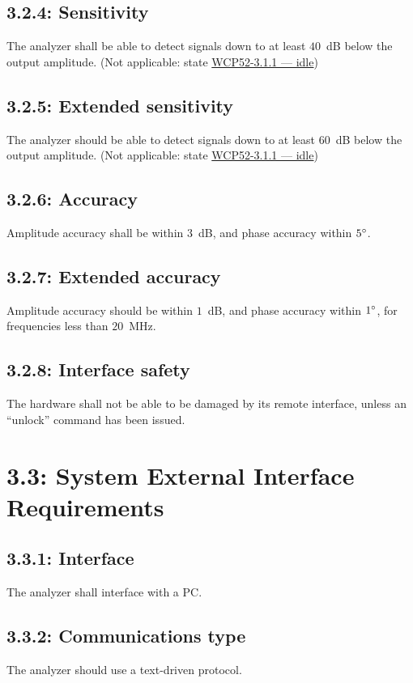\subsection*{3.2.4: Sensitivity}
\label{prs:3.2.4}
The analyzer shall be able to detect signals down to at least $40$~dB below the output
amplitude. (Not applicable: state \hyperref[prs:3.1.1]{WCP52-3.1.1 --- idle})

\subsection*{3.2.5: Extended sensitivity}
\label{prs:3.2.5}
The analyzer should be able to detect signals down to at least $60$~dB below the output
amplitude. (Not applicable: state \hyperref[prs:3.1.1]{WCP52-3.1.1 --- idle})

\subsection*{3.2.6: Accuracy}
\label{prs:3.2.6}
Amplitude accuracy shall be within $3$~dB, and phase accuracy within $5{}^\circ$.

\subsection*{3.2.7: Extended accuracy}
\label{prs:3.2.7}
Amplitude accuracy should be within $1$~dB, and phase accuracy within $1{}^\circ$, for
frequencies less than $20$~MHz.

\subsection*{3.2.8: Interface safety}
\label{prs:3.2.8}
The hardware shall not be able to be damaged by its remote interface, unless an ``unlock'' command
has been issued.

\section*{3.3: System External Interface Requirements}

\subsection*{3.3.1: Interface}
\label{prs:3.3.1}
The analyzer shall interface with a PC.

\subsection*{3.3.2: Communications type}
\label{prs:3.3.2}
The analyzer should use a text-driven protocol.

